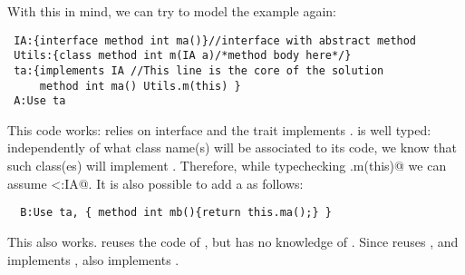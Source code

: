 




With this in mind, we can try to model the example again:
\saveSpace
\begin{lstlisting}
 IA:{interface method int ma()}//interface with abstract method
 Utils:{class method int m(IA a)/*method body here*/}
 ta:{implements IA //This line is the core of the solution
     method int ma() Utils.m(this) }
 A:Use ta
\end{lstlisting}
\saveSpace
This code works: \Q@Utils@ relies on interface \Q@IA@ and the trait \Q@ta@
implements \Q@IA@.
\Q@ta@ is well typed: independently of what class name(s) will be
associated to its code, we know that such class(es) will implement
\Q@IA@. 
Therefore, while typechecking \Q@Utils.m(this)@ we can assume
\Q@this<:IA@.
 It is also possible to add a \Q@B@ as follows:
\saveSpace
\begin{lstlisting}
  B:Use ta, { method int mb(){return this.ma();} }
\end{lstlisting}
\saveSpace
This also works.  \Q@B@ reuses the code of \Q@ta@, but has no knowledge of \Q@A@.
Since \Q@B@ reuses \Q@ta@, and \Q@ta@ implements \Q@IA@, also \Q@B@ implements \Q@IA@. 


